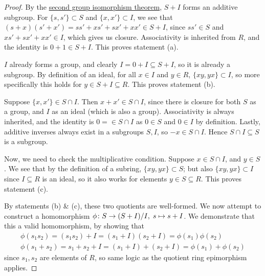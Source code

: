 \begin{proof}
    By the \hyperref[thm:iso-2-group]{second group isomorphism theorem},
    \(S+I\) forms an additive subgroup.
    For \(\{s,s'\} \subset S\) and \(\{x,x'\} \subset I\),
    we see that \((s+x)(s'+x') = ss' + xs' + sx' + xx' \in S+I\),
    since \(ss' \in S\) and \(xs' + sx' + xx' \in I\),
    which gives us closure.
    Associativity is inherited from \(R\),
    and the identity is \(0+1 \in S+I\).
    This proves statement (a).

    \medskip

    \(I\) already forms a group,
    and clearly \(I = 0+I \subseteq S+I\),
    so it is already a subgroup.
    By definition of an ideal,
    for all \(x \in I\) and \(y \in R\), \(\{xy,yx\} \subset I\),
    so more specifically this holds for \(y \in S+I \subseteq R\).
    This proves statement (b).

    \medskip

    Suppose \(\{x,x'\} \in S \cap I\).
    Then \(x+x' \in S \cap I\),
    since there is closure for both \(S\) as a group,
    and \(I\) as an ideal (which is also a group).
    Associativity is always inherited,
    and the identity is \(0 = \in S \cap I\)
    as \(0 \in S\) and \(0 \in I\) by definition.
    Lastly, additive inverses always exist in a subgroups \(S,I\),
    so \(-x \in S \cap I\).
    Hence \(S \cap I \subseteq S\) is a subgroup.

    Now, we need to check the multiplicative condition.
    Suppose \(x \in S \cap I\), and \(y \in S\).
    We see that by the definition of a subring, \(\{xy,yx\} \subset S\);
    but also \(\{xy,yx\} \subset I\) since \(I \subseteq R\) is an ideal,
    so it also works for elements \(y \in S \subseteq R\).
    This proves statement (c).

    \medskip

    By statements (b) \& (c), these two quotients are well-formed.
    We now attempt to construct a homomorphism
    \(\phi\colon S\to(S+I)/I,\;s\mapsto s+I\).
    We demonstrate that this a valid homomorphism,
    by showing that
    \begin{gather*}
        \phi(s_1 s_2) = (s_1 s_2)+I = (s_1 + I)(s_2 + I) = \phi(s_1)\phi(s_2) \\
        \phi(s_1+s_2) = s_1+s_2+I = (s_1+I) + (s_2+I) = \phi(s_1) + \phi(s_2)
    \end{gather*}
    since \(s_1, s_2\) are elements of \(R\),
    so same logic as the quotient ring epimorphism applies.


\end{proof}
